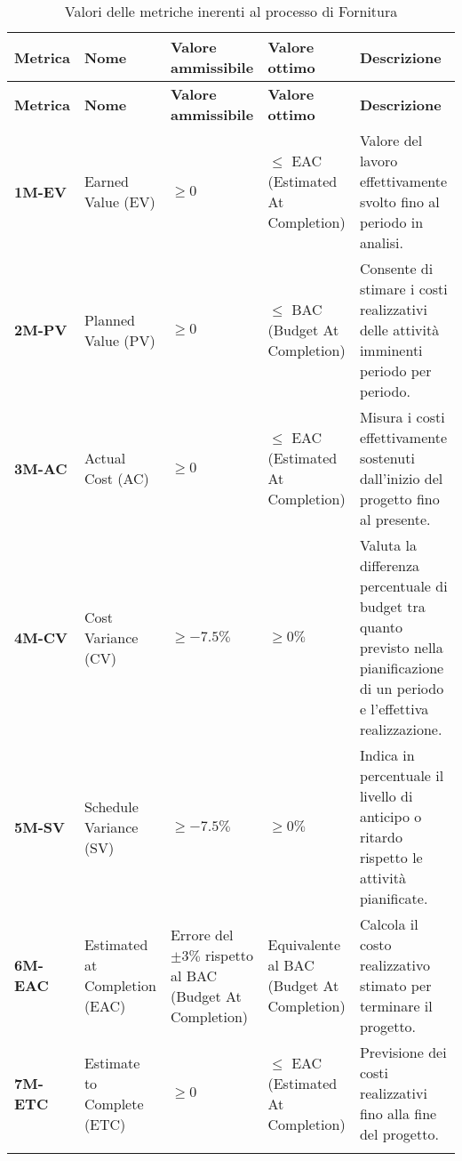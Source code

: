 \begin{longtable}{|>{\centering\arraybackslash}p{}|>{\centering\arraybackslash}p{}|>{\centering\arraybackslash}p{}|>{\centering\arraybackslash}p{}|>{\centering\arraybackslash}p{}|}
    \hline
    \textbf{Metrica} & \textbf{Nome} & \textbf{Valore ammissibile} & \textbf{Valore ottimo}& \textbf{Descrizione}\\
	\hline
    \endfirsthead
    \hline
    \textbf{Metrica} & \textbf{Nome} & \textbf{Valore ammissibile} & \textbf{Valore ottimo}& \textbf{Descrizione}\\
    \endhead
    \textbf{1M-EV} & Earned Value (EV) & $\geq 0$ & $\leq$ EAC (Estimated At Completion) & Valore del lavoro effettivamente svolto fino al periodo in analisi.\\
    \hline
	\textbf{2M-PV} 	& Planned Value (PV) 		  & $\geq 0$   & $\leq$ BAC (Budget At Completion) &  Consente di stimare i costi realizzativi delle attività imminenti periodo per periodo.\\ 
	\hline
	\textbf{3M-AC} 	& Actual Cost (AC) 				& $\geq 0$ 						& $\leq$ EAC (Estimated At Completion) & Misura i costi effettivamente sostenuti dall'inizio del progetto fino al presente.\\ 
	\hline
	\textbf{4M-CV} 	& Cost Variance (CV) 			& $\geq -7.5\%$ 				& $\geq 0\%$ &  Valuta la differenza percentuale di budget tra quanto previsto nella pianificazione di un periodo e l'effettiva realizzazione.\\ 
	\hline
	\textbf{5M-SV} 	& Schedule Variance (SV) 		& $\geq -7.5\%$ 				& $\geq 0\%$ & Indica in percentuale il livello di anticipo o ritardo rispetto le attività pianificate.\\ 
	\hline
	\textbf{6M-EAC} 	& Estimated at Completion (EAC) & Errore del $\pm 3\%$ rispetto al BAC (Budget At Completion)  & Equivalente al BAC (Budget At Completion) & Calcola il costo realizzativo stimato per terminare il progetto.\\ 
	\hline
	\textbf{7M-ETC} 	& Estimate to Complete (ETC)  	& $\geq 0$ & $\leq$ EAC (Estimated At Completion) & Previsione dei costi realizzativi fino alla fine del progetto.\\ 
	\hline
    \caption{Valori delle metriche inerenti al processo di Fornitura}
    \label{table:1}
\end{longtable}

